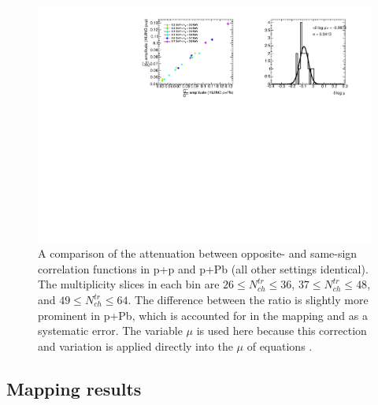 \begin{figure}[t]
\begin{minipage}[t]{1.0\textwidth}
\centering
\includegraphics{mu_hijing_pp_pPb.pdf}
\end{minipage}
\caption{A comparison of the attenuation between opposite- and same-sign correlation functions in \Hijing p+p and \Hijing p+Pb (all other settings identical). The multiplicity slices in each \kt bin are $26 \leq N_{ch}^{tr} \leq 36$, $37 \leq N_{ch}^{tr} \leq 48$, and $49 \leq N_{ch}^{tr} \leq 64$. The difference between the ratio is slightly more prominent in p+Pb, which is accounted for in the mapping and as a systematic error. The variable $\mu$ is used here because this correction and variation is applied directly into the $\mu$ of equations .}
\label{fig:mu_hijing_pp_pPb}
\end{figure}

\FloatBarrier

\subsection{Mapping results}

